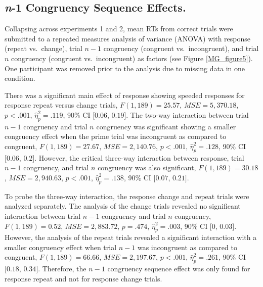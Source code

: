 \documentclass[]{DissertateCUNY}
\begin{document}
\hypertarget{congruency-sequence-effects.-5}{%
\subsection{\texorpdfstring{\textit{n}-1 Congruency Sequence
Effects.}{-1 Congruency Sequence Effects.}}\label{congruency-sequence-effects.-5}}

Collapsing across experiments 1 and 2, mean RTs from correct trials were
submitted to a repeated measures analysis of variance (ANOVA) with
response (repeat vs.~change), trial \(n-1\) congruency (congruent
vs.~incongruent), and trial \(n\) congruency (congruent vs.~incongruent)
as factors (see Figure \ref{MG_figure5}). One participant was removed
prior to the analysis due to missing data in one condition.

There was a significant main effect of response showing speeded
responses for response repeat versus change trials,
\(F(1, 189) = 25.57\), \(\mathit{MSE} = 5,370.18\), \(p < .001\),
\(\hat{\eta}^2_p = .119\), 90\% CI \([0.06\), \(0.19]\). The two-way
interaction between trial \(n-1\) congruency and trial \(n\) congruency
was significant showing a smaller congruency effect when the prime trial
was incongruent as compared to congruent, \(F(1, 189) = 27.67\),
\(\mathit{MSE} = 2,140.76\), \(p < .001\), \(\hat{\eta}^2_p = .128\),
90\% CI \([0.06\), \(0.2]\). However, the critical three-way interaction
between response, trial \(n-1\) congruency, and trial \(n\) congruency
was also significant, \(F(1, 189) = 30.18\),
\(\mathit{MSE} = 2,940.63\), \(p < .001\), \(\hat{\eta}^2_p = .138\),
90\% CI \([0.07\), \(0.21]\).

To probe the three-way interaction, the response change and repeat
trials were analyzed separately. The analysis of the change trials
revealed no significant interaction between trial \(n-1\) congruency and
trial \(n\) congruency, \(F(1, 189) = 0.52\),
\(\mathit{MSE} = 2,883.72\), \(p = .474\), \(\hat{\eta}^2_p = .003\),
90\% CI \([0\), \(0.03]\). However, the analysis of the repeat trials
revealed a significant interaction with a smaller congruency effect when
trial \(n-1\) was incongruent as compared to congruent,
\(F(1, 189) = 66.66\), \(\mathit{MSE} = 2,197.67\), \(p < .001\),
\(\hat{\eta}^2_p = .261\), 90\% CI \([0.18\), \(0.34]\). Therefore, the
\(n-1\) congruency sequence effect was only found for response repeat
and not for response change trials.
\end{document}
